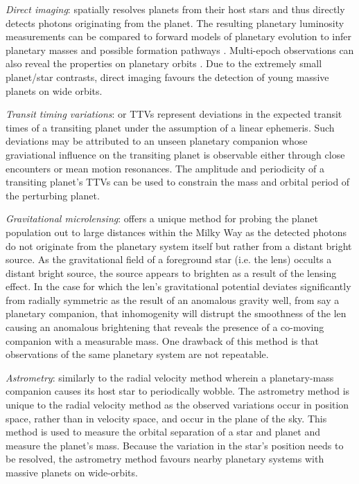 \emph{Direct imaging}: spatially resolves planets from their host stars and thus
directly detects photons originating from the planet. The resulting planetary luminosity
measurements can be compared to forward models of planetary
evolution to infer planetary masses and possible formation pathways \citep{marley07}.
Multi-epoch observations can also reveal the properties on planetary orbits \citep{wang18}.
Due to the extremely small planet/star contrasts, direct imaging favours the detection
of young massive planets on wide orbits.


\emph{Transit timing variations}: or TTVs represent deviations in the expected transit
times of a transiting planet under the assumption of a linear ephemeris. Such deviations
may be attributed to an unseen planetary companion whose graviational influence on the
transiting planet is observable either through close encounters or mean motion resonances.
The amplitude and periodicity of a transiting planet's TTVs can be used to constrain the mass
and orbital period of the perturbing planet.

\emph{Gravitational microlensing}:
offers a unique method for probing the planet population out to large distances
within the Milky Way as the detected photons do not originate from the planetary system itself
but rather from a distant bright source. As the gravitational field of a
foreground star (i.e. the lens) occults a distant bright source, the source appears to
brighten as a result of the lensing effect. In the case for which the len's gravitational
potential deviates significantly from radially symmetric as the result of an anomalous gravity
well, from say a planetary companion, that inhomogenity will distrupt the smoothness of the
len causing an anomalous brightening that reveals the presence of a co-moving companion with
a measurable mass. One drawback of this method is that observations of the same planetary
system are not repeatable.

\emph{Astrometry}: similarly to the radial velocity method wherein a planetary-mass companion
causes its host star to periodically wobble. The astrometry method is unique to the radial velocity
method as the observed variations occur in position space, rather than in velocity space, and
occur in the plane of the sky. This method is used to measure the orbital separation of a
star and planet and measure the planet's mass. Because the variation in the star's position
needs to be resolved, the astrometry method favours nearby planetary systems with massive
planets on wide-orbits.


